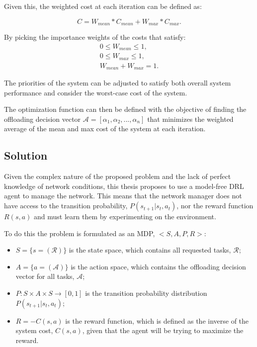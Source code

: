 \documentclass[conference]{IEEEtran}
\begin{document}
Given this, the weighted cost at each iteration can be defined as:

\begin{equation} \label{cost_function}
    C = W_{mean}*C_{mean} + W_{max}*C_{max}.
\end{equation}

By picking the importance weights of the costs that satisfy:
\begin{align*}
    0 \leq W_{mean} \leq 1, \\
    0 \leq W_{max} \leq 1,  \\
    W_{mean} + W_{max} = 1.
\end{align*}

The priorities of the system can be adjusted to satisfy both overall system performance and consider the worst-case cost of the system.

The optimization function can then be defined with the objective of finding the offloading decision vector $\mathcal{A} = [\alpha_1, \alpha_2, ..., \alpha_n]$ that minimizes the weighted average of the mean and max cost of the system at each iteration.

\subsection{Solution} \label{solution}
\noindent Given the complex nature of the proposed problem and the lack of perfect knowledge of network conditions, this thesis proposes to use a model-free \acrshort{DRL} agent to manage the network. This means that the network manager does not have access to the transition probability, $P(s_{t+1}|s_t, a_t)$, nor the reward function $R(s, a)$ and must learn them by experimenting on the environment.

To do this the problem is formulated as an \acrshort{MDP}, $<S, A, P, R>$:
\begin{itemize}
    \item $S=\{s=(\mathcal{R})\}$ is the state space, which contains all requested tasks, $\mathcal{R}$;
    \item $A=\{a=(\mathcal{A})\}$ is the action space, which contains the offloading decision vector for all tasks, $\mathcal{A}$;
    \item $P:S \times A \times S \rightarrow [0, 1]$ is the transition probability distribution $P(s_{t+1}|s_t, a_t)$;
    \item $R = -C(s,a)$ is the reward function, which is defined as the inverse of the system cost, $C(s,a)$, given that the agent will be trying to maximize the reward.
\end{itemize}
\end{document}
